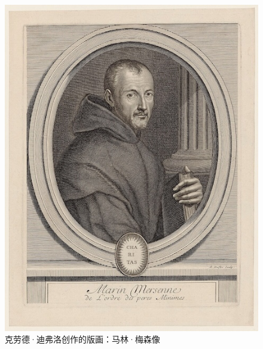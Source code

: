 \documentclass[b5paper]{ctexart}
\begin{document}
\begin{figure}[htbp]
 \centering
 \includegraphics[scale=0.35]{img/MarinMersenne}
 \caption{克劳德·迪弗洛创作的版画：马林·梅森像}
 \label{fig:marin-mersenne}
\end{figure}
\end{document}
